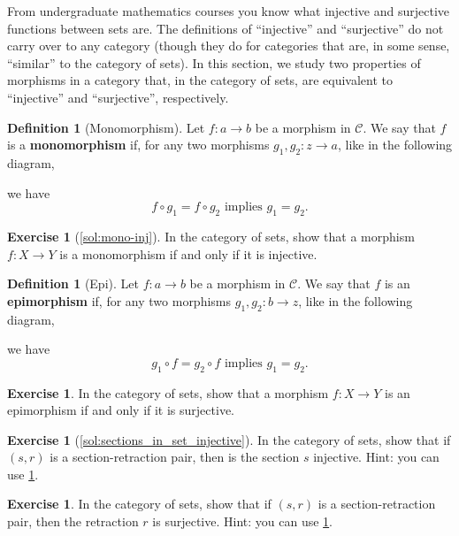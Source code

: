\documentclass[a4paper,10pt]{scrartcl}
\theoremstyle{plain}
\theoremstyle{definition}
\newtheorem{dfn}[thm]{Definition}
\newtheorem{exer}[thm]{Exercise}
\newcommand{\Cat}[1]{\mathcal{#1}}
\newcommand{\CC}{\Cat{C}}
\newcommand{\co}[2]{\ensuremath{#2 \circ #1}}
\begin{document}
From undergraduate mathematics courses you know what injective and surjective functions between sets are.
The definitions of ``injective'' and ``surjective'' do not carry over to any category (though they do for categories that are, in some sense, ``similar'' to the category of sets).
In this section, we study two properties of morphisms in a category that, in the category of sets, are equivalent to ``injective'' and ``surjective'', respectively.



\begin{dfn}[Monomorphism]
  Let $f : a \to b$ be a morphism in $\CC$. We say that $f$ is a \textbf{monomorphism} if, for any two morphisms $g_1, g_2 : z \to a$, like in the following diagram,
  \begin{center}
  \end{center}
  we have
  \[ \co{g_1}{f} = \co{g_2}{f} \text{ implies } g_1 = g_2 .\]
\end{dfn}

\begin{exer}[\cref{sol:mono-inj}]\label{ex:mono-inj}
  In the category of sets, show that a morphism $f : X \to Y$ is a monomorphism if and only if it is injective.
\end{exer}

\begin{dfn}[Epi]
  Let $f : a \to b$ be a morphism in $\CC$. We say that $f$ is an \textbf{epimorphism} if, for any two morphisms $g_1, g_2 : b \to z$, like in the following diagram,
  \begin{center}
  \end{center}
  we have
  \[ \co{f}{g_1} = \co{f}{g_2} \text{ implies } g_1 = g_2 .\]
\end{dfn}

\begin{exer}\label{ex:epi-surj}
  In the category of sets, show that a morphism $f : X \to Y$ is an epimorphism if and only if it is surjective.
\end{exer}


\begin{exer}[\cref{sol:sections_in_set_injective}]\label{exer:sections_in_set_injective}
  In the category of sets, show that if $(s,r)$ is a section-retraction pair, then is the section $s$ injective.
  Hint: you can use \cref{ex:mono-inj}.
\end{exer}
\begin{exer}
  In the category of sets, show that if $(s,r)$ is a section-retraction pair, then the retraction $r$ is surjective.
    Hint: you can use \cref{ex:epi-surj}.
\end{exer}
\end{document}
